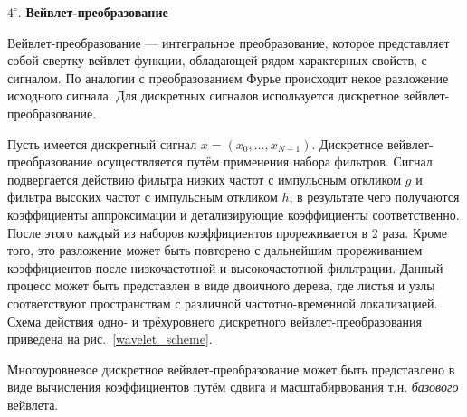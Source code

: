 \documentclass[12pt,fleqn]{article}
\begin{document}
	\par $4^{\circ}.$ {\bf Вейвлет-преобразование}
	\par Вейвлет-преобразование — интегральное преобразование, которое представляет собой свертку вейвлет-функции, обладающей рядом характерных свойств, с сигналом. По аналогии с преобразованием Фурье происходит некое разложение исходного сигнала. Для дискретных сигналов используется дискретное вейвлет-преобразование.
	\par Пусть имеется дискретный сигнал $x = (x_0, \dots, x_{N-1})$. Дискретное вейвлет-преобразование осуществляется путём применения набора фильтров. Сигнал подвергается действию фильтра низких частот с импульсным откликом $g$ и фильтра высоких частот с импульсным откликом $h$, в результате чего получаются коэффициенты аппроксимации и детализирующие коэффициенты соответственно. После этого каждый из наборов коэффициентов прореживается в 2 раза. Кроме того, это разложение может быть повторено с дальнейшим прореживанием коэффициентов после низкочастотной и высокочастотной фильтрации. Данный процесс может быть представлен в виде двоичного дерева, где листья и узлы соответствуют пространствам с различной частотно-временной локализацией. Схема действия одно- и трёхуровнего дискретного вейвлет-преобразования приведена на рис.~\ref{wavelet_scheme}.
	\par Многоуровневое дискретное вейвлет-преобразование может быть представлено в виде вычисления коэффициентов путём сдвига и масштабирвования т.н. {\it базового} вейвлета.
\end{document}
